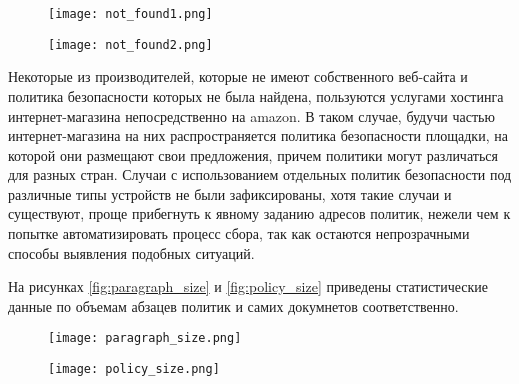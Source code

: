 \documentclass[../main]{subfiles}
\begin{document}
\begin{figure}[H]
    \centering
    {\texttt{[image: not\_found1.png]}}
    \vspace{-\baselineskip}
\end{figure}

\begin{figure}[H]
    \centering
    {\texttt{[image: not\_found2.png]}}
    \vspace{-\baselineskip}
\end{figure}

Некоторые из производителей, которые не имеют собственного веб-сайта и политика безопасности которых не была найдена, пользуются услугами хостинга интернет-магазина непосредственно на amazon. В таком случае, будучи частью интернет-магазина на них распространяется политика безопасности площадки, на которой они размещают свои предложения, причем политики могут различаться для разных стран. Случаи с использованием отдельных политик безопасности под различные типы устройств не были зафиксированы, хотя такие случаи и существуют, проще прибегнуть к явному заданию адресов политик, нежели чем к попытке автоматизировать процесс сбора, так как остаются непрозрачными способы выявления подобных ситуаций.

На рисунках \ref{fig:paragraph_size} и \ref{fig:policy_size} приведены статистические данные по объемам абзацев политик и самих докумнетов соответственно.

\begin{figure}[H]
    \centering
    {\texttt{[image: paragraph\_size.png]}}
    \vspace{-\baselineskip}
\end{figure}

\begin{figure}[H]
    \centering
    {\texttt{[image: policy\_size.png]}}
    \vspace{-\baselineskip}
\end{figure}
\end{document}
